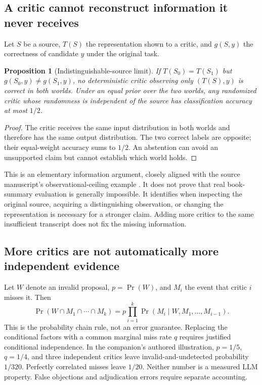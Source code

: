 \documentclass[11pt,a4paper]{article}
\newtheorem{proposition}[definition]{Proposition}
\begin{document}
\subsection{A critic cannot reconstruct information it never receives}
Let $S$ be a source, $T(S)$ the representation shown to a critic, and $g(S,y)$ the correctness of candidate $y$ under the original task.
\begin{proposition}[Indistinguishable-source limit]\label{prop:source}
If $T(S_0)=T(S_1)$ but $g(S_0,y)\ne g(S_1,y)$, no deterministic critic observing only $(T(S),y)$ is correct in both worlds. Under an equal prior over the two worlds, any randomized critic whose randomness is independent of the source has classification accuracy at most $1/2$.
\end{proposition}
\begin{proof}
The critic receives the same input distribution in both worlds and therefore has the same output distribution. The two correct labels are opposite; their equal-weight accuracy sums to $1/2$. An abstention can avoid an unsupported claim but cannot establish which world holds.
\end{proof}
This is an elementary information argument, closely aligned with the source manuscript's observational-ceiling example \cite[Sec.~3]{ti}. It does not prove that real book-summary evaluation is generally impossible. It identifies when inspecting the original source, acquiring a distinguishing observation, or changing the representation is necessary for a stronger claim. Adding more critics to the same insufficient transcript does not fix the missing information.

\subsection{More critics are not automatically more independent evidence}
Let $W$ denote an invalid proposal, $p=\Pr(W)$, and $M_i$ the event that critic $i$ misses it. Then
\begin{equation}
\Pr(W\cap M_1\cap\cdots\cap M_k)=p\prod_{i=1}^{k}\Pr(M_i\mid W,M_1,\ldots,M_{i-1}).\label{eq:critics}
\end{equation}
This is the probability chain rule, not an error guarantee. Replacing the conditional factors with a common marginal miss rate $q$ requires justified conditional independence. In the companion's authored illustration, $p=1/5$, $q=1/4$, and three independent critics leave invalid-and-undetected probability $1/320$. Perfectly correlated misses leave $1/20$. Neither number is a measured LLM property. False objections and adjudication errors require separate accounting.
\end{document}

